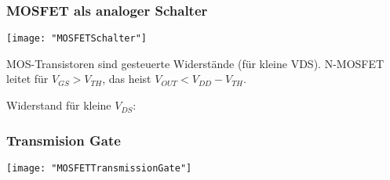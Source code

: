 \subsubsection{MOSFET als analoger Schalter}
\begin{minipage}[t]{0.3\textwidth}
	\vspace{0pt}								%
	\texttt{[image: "MOSFETSchalter"]}
\end{minipage}\hspace{0.05\textwidth}
\begin{minipage}[t]{0.65\textwidth}
	\vspace{0pt}								%
	MOS-Transistoren sind gesteuerte Widerstände (für kleine VDS).
	N-MOSFET leitet für $V_{GS} > V_{TH}$, das heist $V_{OUT} < V_{DD} - V_{TH}$.
	
	Widerstand für kleine $V_{DS}$:
	
	
\end{minipage}
\vspace{2mm}

\subsubsection{Transmision Gate}
\begin{minipage}[t]{0.3\textwidth}
	\vspace{0pt}								%
	\texttt{[image: "MOSFETTransmissionGate"]}
\end{minipage}\hspace{0.05\textwidth}
\begin{minipage}[t]{0.65\textwidth}
	\vspace{0pt}								%
	
\end{minipage}
\vspace{2mm}








